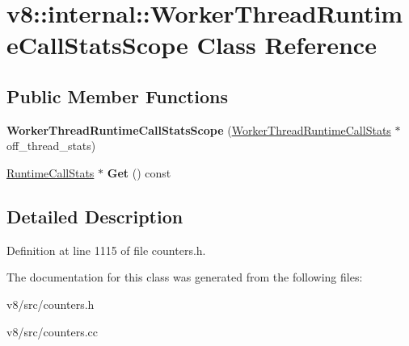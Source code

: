 \hypertarget{classv8_1_1internal_1_1WorkerThreadRuntimeCallStatsScope}{}\section{v8\+:\+:internal\+:\+:Worker\+Thread\+Runtime\+Call\+Stats\+Scope Class Reference}
\label{classv8_1_1internal_1_1WorkerThreadRuntimeCallStatsScope}
\subsection*{Public Member Functions}
\begin{DoxyCompactItemize}
\item 
\mbox{\label{classv8_1_1internal_1_1WorkerThreadRuntimeCallStatsScope_aafce3b8dd4aa5140f812406523a98203}} 
{\bfseries Worker\+Thread\+Runtime\+Call\+Stats\+Scope} (\mbox{\hyperlink{classv8_1_1internal_1_1WorkerThreadRuntimeCallStats}{Worker\+Thread\+Runtime\+Call\+Stats}} $\ast$off\+\_\+thread\+\_\+stats)
\item 
\mbox{\label{classv8_1_1internal_1_1WorkerThreadRuntimeCallStatsScope_acf0b4a863aaa06ed6a53fa9126785ed3}} 
\mbox{\hyperlink{classv8_1_1internal_1_1RuntimeCallStats}{Runtime\+Call\+Stats}} $\ast$ {\bfseries Get} () const
\end{DoxyCompactItemize}


\subsection{Detailed Description}


Definition at line 1115 of file counters.\+h.



The documentation for this class was generated from the following files\+:\begin{DoxyCompactItemize}
\item 
v8/src/counters.\+h\item 
v8/src/counters.\+cc\end{DoxyCompactItemize}
